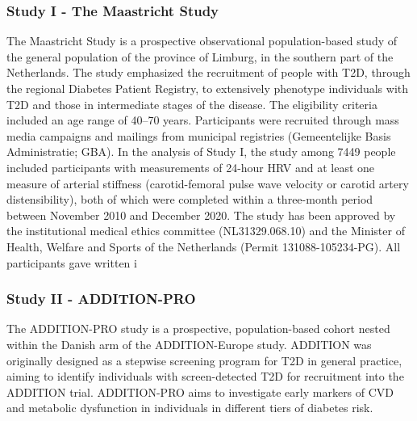 \documentclass[
  a4paper,
  headsepline=true,
  open=any]{scrbook}
\begin{document}
\hypertarget{study-i---the-maastricht-study}{%
\subsubsection{Study I - The Maastricht
Study}\label{study-i---the-maastricht-study}}

The Maastricht Study is a prospective observational population-based
study of the general population of the province of Limburg, in the
southern part of the Netherlands. The study emphasized the recruitment
of people with T2D, through the regional Diabetes Patient Registry, to
extensively phenotype individuals with T2D and those in intermediate
stages of the disease. The eligibility criteria included an age range of
40--70 years. Participants were recruited through mass media campaigns
and mailings from municipal registries (Gemeentelijke Basis
Administratie; GBA). In the analysis of Study I, the study among 7449
people included participants with measurements of 24-hour HRV and at
least one measure of arterial stiffness (carotid-femoral pulse wave
velocity or carotid artery distensibility), both of which were completed
within a three-month period between November 2010 and December 2020. The
study has been approved by the institutional medical ethics committee
(NL31329.068.10) and the Minister of Health, Welfare and Sports of the
Netherlands (Permit 131088-105234-PG). All participants gave written i

\hypertarget{study-ii---addition-pro}{%
\subsubsection{Study II - ADDITION-PRO}\label{study-ii---addition-pro}}

The ADDITION-PRO study is a prospective, population-based cohort nested
within the Danish arm of the ADDITION-Europe study. ADDITION was
originally designed as a stepwise screening program for T2D in general
practice, aiming to identify individuals with screen-detected T2D for
recruitment into the ADDITION trial. ADDITION-PRO aims to investigate
early markers of CVD and metabolic dysfunction in individuals in
different tiers of diabetes risk.
\end{document}
